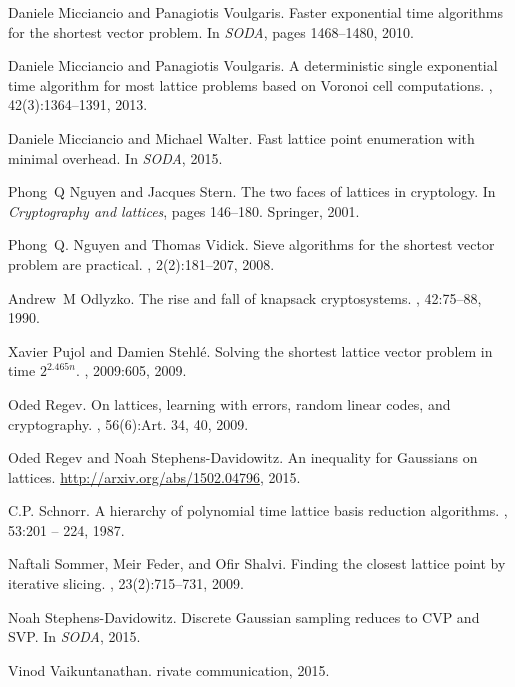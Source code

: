\documentclass[11pt]{article}
\begin{document}
\begin{thebibliography}{DKRS03}
Daniele Micciancio and Panagiotis Voulgaris.
\newblock Faster exponential time algorithms for the shortest vector problem.
\newblock In {\em SODA}, pages 1468--1480, 2010.

Daniele Micciancio and Panagiotis Voulgaris.
\newblock A deterministic single exponential time algorithm for most lattice
  problems based on {V}oronoi cell computations.
, 42(3):1364--1391, 2013.

Daniele Micciancio and Michael Walter.
\newblock Fast lattice point enumeration with minimal overhead.
\newblock In {\em SODA}, 2015.

Phong~Q Nguyen and Jacques Stern.
\newblock The two faces of lattices in cryptology.
\newblock In {\em Cryptography and lattices}, pages 146--180. Springer, 2001.

Phong~Q. Nguyen and Thomas Vidick.
\newblock Sieve algorithms for the shortest vector problem are practical.
, 2(2):181--207, 2008.

Andrew~M Odlyzko.
\newblock The rise and fall of knapsack cryptosystems.
, 42:75--88, 1990.

Xavier Pujol and Damien Stehl{\'e}.
\newblock Solving the shortest lattice vector problem in time $2^{2.465 n}$.
, 2009:605, 2009.

Oded Regev.
\newblock On lattices, learning with errors, random linear codes, and
  cryptography.
, 56(6):Art. 34, 40, 2009.

Oded Regev and Noah Stephens{-}Davidowitz.
\newblock An inequality for {G}aussians on lattices.
\newblock \url{http://arxiv.org/abs/1502.04796}, 2015.

C.P. Schnorr.
\newblock A hierarchy of polynomial time lattice basis reduction algorithms.
, 53:201 -- 224, 1987.

Naftali Sommer, Meir Feder, and Ofir Shalvi.
\newblock Finding the closest lattice point by iterative slicing.
, 23(2):715--731, 2009.

Noah Stephens{-}Davidowitz.
\newblock Discrete {G}aussian sampling reduces to {CVP} and {SVP}.
\newblock In {\em SODA}, 2015.

Vinod Vaikuntanathan.
rivate communication, 2015.

\end{thebibliography}
\end{document}
